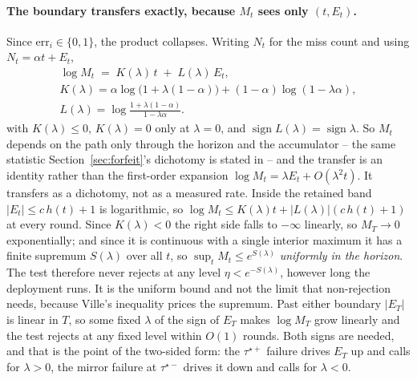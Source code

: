 \paragraph{The boundary transfers exactly, because $M_t$ sees only $(t, E_t)$.} Since
$\mathrm{err}_i \in \{0,1\}$, the product collapses. Writing $N_t$ for the miss count and using
$N_t = \alpha t + E_t$,
\begin{gather*}
  \log M_t \;=\; K(\lambda)\,t \;+\; L(\lambda)\,E_t, \\
  K(\lambda) = \alpha\log\!\big(1+\lambda(1-\alpha)\big) + (1-\alpha)\log(1-\lambda\alpha), \\
  L(\lambda) = \log\frac{1+\lambda(1-\alpha)}{1-\lambda\alpha} .
\end{gather*}
with $K(\lambda) \le 0$, $K(\lambda) = 0$ only at $\lambda = 0$, and $\operatorname{sign}
L(\lambda) = \operatorname{sign}\lambda$. So $M_t$ depends on the path only through the horizon and
the accumulator -- the same statistic Section~\ref{sec:forfeit}'s dichotomy is stated in -- and the
transfer is an identity rather than the first-order expansion $\log M_t = \lambda E_t +
O(\lambda^2 t)$. It transfers as a dichotomy, not as a measured rate. Inside the retained band
$|E_t| \le c\,h(t)+1$ is logarithmic, so $\log M_t \le K(\lambda)t + |L(\lambda)|(c\,h(t)+1)$ at
every round. Since $K(\lambda) < 0$ the right side falls to $-\infty$ linearly, so $M_T \to 0$
exponentially; and since it is continuous with a single interior maximum it has a finite supremum
$S(\lambda)$ over all $t$, so $\sup_t M_t \le e^{S(\lambda)}$ \emph{uniformly in the horizon}. The
test therefore never rejects at any level $\eta < e^{-S(\lambda)}$, however long the deployment
runs. It is the uniform bound and not the limit that non-rejection needs, because Ville's
inequality prices the supremum. Past either boundary $|E_T|$ is linear in $T$, so some fixed
$\lambda$ of the sign of $E_T$ makes $\log M_T$ grow linearly and the test rejects at any fixed
level within $O(1)$ rounds. Both signs are needed, and that is the point of the two-sided form:
the $\tau^{\star+}$ failure drives $E_T$ up and calls for $\lambda > 0$, the mirror failure at
$\tau^{\star-}$ drives it down and calls for $\lambda < 0$.

